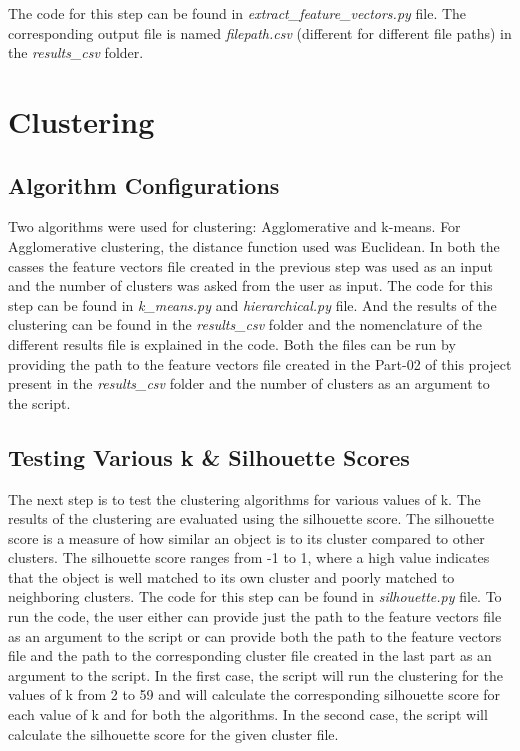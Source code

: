 \documentclass{article}
\newcommand\templateInstruction[1]{
\hl{#1}
}
\begin{document}
The code for this step can be found in \textit{extract\_feature\_vectors.py} file.
The corresponding output file is named \textit{filepath.csv} (different for different file paths) in the \textit{results\_csv} folder.

\section{Clustering}
\label{sec:clustering}

\subsection{Algorithm Configurations}
Two algorithms were used for clustering: Agglomerative and k-means. For Agglomerative clustering, the distance function used was Euclidean. In both the casses the feature vectors file created in the previous step was used as an input and the 
number of clusters was asked from the user as input. The code for this step can be found in \textit{k\_means.py} and \textit{hierarchical.py} file.
And the results of the clustering can be found in the \textit{results\_csv} folder and the nomenclature of the different results file is explained in the code.
Both the files can be run by providing the path to the feature vectors file created in the Part-02 of this project present in the \textit{results\_csv} folder and the number of clusters as an argument to the script.

\subsection{Testing Various k \& Silhouette Scores}
The next step is to test the clustering algorithms for various values of k. The results of the clustering are evaluated using the silhouette score.
The silhouette score is a measure of how similar an object is to its cluster compared to other clusters. The silhouette score ranges from -1 to 1, where a high value indicates that the object is well matched to its own cluster and poorly matched to neighboring clusters.
The code for this step can be found in \textit{silhouette.py} file.
To run the code, the user either can provide just the path to the feature vectors file as an argument to the script or can provide both the path to the feature vectors file and the path to the corresponding cluster file created in the last part as an argument to the script.
In the first case, the script will run the clustering for the values of k from 2 to 59 and will calculate the corresponding silhouette score for each value of k and for both the algorithms. In the second case, the script will calculate the silhouette score for the given cluster file.
\end{document}
